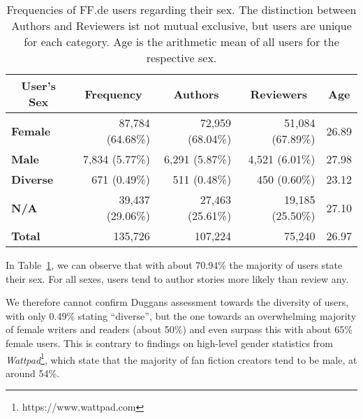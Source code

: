 \begin{table}[htb]
    \renewcommand{\arraystretch}{1.5}
    \centering
    \begin{tabular}{lrrrr}
        \toprule
        \multicolumn{1}{c}{\textbf{User's Sex}} &
        \multicolumn{1}{c}{\textbf{Frequency}} &
        \multicolumn{1}{c}{\textbf{Authors}} &
        \multicolumn{1}{c}{\textbf{Reviewers}} &
        \multicolumn{1}{c}{\textbf{Age}} \\
        \midrule
        \textbf{Female}  & 87,784 (64.68\%) & 72,959 (68.04\%) & 51,084 (67.89\%) & 26.89 \\
        \textbf{Male}    & 7,834 (5.77\%)   & 6,291 (5.87\%)   & 4,521 (6.01\%)   & 27.98 \\
        \textbf{Diverse} & 671 (0.49\%)     & 511 (0.48\%)     & 450 (0.60\%)     & 23.12 \\
        \textbf{N/A}     & 39,437 (29.06\%) & 27,463 (25.61\%) & 19,185 (25.50\%) & 27.10 \\
        \midrule
        \textbf{Total}   & 135,726          & 107,224          & 75,240           & 26.97 \\
        \bottomrule
    \end{tabular}
    \caption[Frequencies of FF.de users regarding their sex.]{Frequencies of FF.de users regarding their sex. The distinction between Authors and Reviewers ist not mutual exclusive, but users are unique for each category. Age is the arithmetic mean of all users for the respective sex.}
    \label{tab:user-gender-frequencies}
\end{table}

In Table~\ref{tab:user-gender-frequencies}, we can observe that with about 70.94\% the majority of users state their sex.
For all sexes, users tend to author stories more likely than review any.

We therefore cannot confirm Duggans assessment towards the diversity of users, with only 0.49\% stating ``diverse'', but the one towards an overwhelming majority of female writers and readers (about 50\%) and even surpass this with about 65\% female users.
This is contrary to \citet{Fast2016ShirtlessCommunity} findings on high-level gender statistics from \emph{Wattpad}\footnote{https://www.wattpad.com}, which state that the majority of fan fiction creators tend to be male, at around 54\%.

